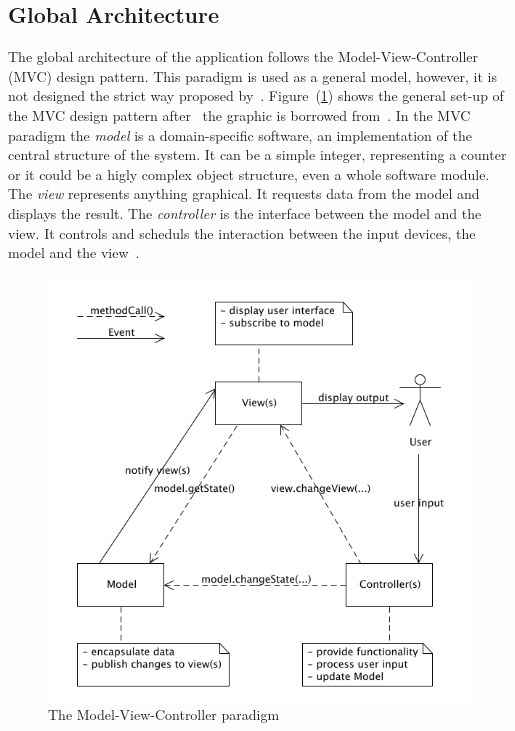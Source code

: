 \subsection{Global Architecture}
\label{sec:globalarchitecture}

The global architecture of the application follows the Model-View-Controller
(MVC) design pattern. This paradigm is used as a general model, however, 
it is not designed the strict way proposed by~.
Figure~(\ref{fig:modelviewcontroller}) shows the general set-up of the 
MVC design pattern after~ the graphic is borrowed 
from~.
In the MVC paradigm the \emph{model} is a domain-specific software, 
an implementation of the central structure of the system. It can be a simple
integer, representing a counter or it could be a higly complex object structure, 
even a whole software module. The \emph{view} represents anything graphical. 
It requests data from the model and displays the result. The \emph{controller} 
is the interface between the model and the view. It controls and scheduls the 
interaction between the input devices, the model and the 
view~.
\begin{figure}[htbp]
\begin{center}
\includegraphics[scale=0.7]{images/TechnicalDesign/MVC2.png}
\caption{The Model-View-Controller paradigm}
\label{fig:modelviewcontroller}
\end{center}
\end{figure}


